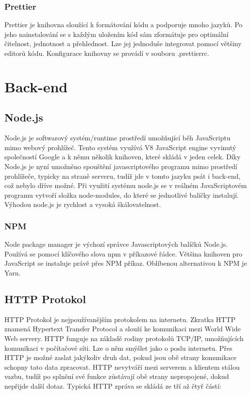 \subsubsection{Prettier}
Prettier je knihovna sloužící k formátování kódu a podporuje mnoho jazyků. Po jeho nainstalování se s každým uložením kód sám zformátuje pro optimální čitelnost, jednotnost a přehlednost. Lze jej jednoduše integrovat pomocí většiny editorů kódu. Konfigurace knihovny se provádí v souboru .prettierrc.

\section{Back-end}
\subsection{Node.js}
Node.js je softwarový systém/runtime prostředí umožňující běh JavaScriptu mimo webový prohlížeč. Tento systém využívá V8 JavaScript engine vyvinutý společností Google a k němu několik knihoven, které skládá v jeden celek. Díky Node.js je nyní umožněno spouštění javascriptového programu mimo prostředí prohlížeče, typicky na straně serveru, tudíž jde v tomto jazyku psát i back-end, což nebylo dříve možné. Při využití systému node.js se v reálném JavaScriptovém programu vytvoří složka node-modules, do které se jednotlivé balíčky instalují. Výhodou node.js je rychlost a vysoká škálovatelnost. \cite{Node} \cite{Pedro}

\subsubsection{NPM}
Node package manager je výchozí správce Javascriptových balíčků Node.js. Používá se pomocí klíčového slova npm v příkazové řádce. Většina knihoven pro JavaScript se instaluje právě přes NPM příkaz. Oblíbenou alternativou k NPM je Yarn.

\subsection{HTTP Protokol}
HTTP Protokol je nejpoužívanějším protokolem na internetu. Zkratka HTTP znamená Hypertext Transfer Protocol a slouží ke komunikaci mezi World Wide Web servery. HTTP funguje na základě rodiny protokolů TCP/IP, umožňujících komunikaci v počítačové síti. Lze o něm smýšlet jako o poslu internetu. Přes HTTP je možné zaslat jakýkoliv druh dat, pokud jsou obě strany komunikace schopny tato data zpracovat. HTTP nevytváří mezi serverem a klientem stálou vazbu, tudíž po splnění své funkce zůstávají obě strany nepropojené, dokud nepřijde další dotaz. \cite{http}Typická HTTP zpráva se skládá ze tří až čtyř částí:
 
